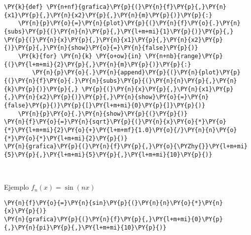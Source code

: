     \begin{tcolorbox}[breakable, size=fbox, boxrule=1pt, pad at break*=1mm,colback=cellbackground, colframe=cellborder]
\begin{Verbatim}[commandchars=\\\{\}]
\PY{k}{def} \PY{n+nf}{grafica}\PY{p}{(}\PY{n}{f}\PY{p}{,}\PY{n}{x1}\PY{p}{,}\PY{n}{x2}\PY{p}{,}\PY{n}{m}\PY{p}{)}\PY{p}{:}
    \PY{n}{p}\PY{o}{=}\PY{n}{plot}\PY{p}{(}\PY{n}{f}\PY{o}{.}\PY{n}{subs}\PY{p}{(}\PY{n}{n}\PY{p}{,}\PY{l+m+mi}{1}\PY{p}{)}\PY{p}{,} \PY{p}{(}\PY{n}{x}\PY{p}{,}\PY{n}{x1}\PY{p}{,}\PY{n}{x2}\PY{p}{)}\PY{p}{,}\PY{n}{show}\PY{o}{=}\PY{n}{false}\PY{p}{)}
    \PY{k}{for} \PY{n}{k} \PY{o+ow}{in} \PY{n+nb}{range}\PY{p}{(}\PY{l+m+mi}{2}\PY{p}{,}\PY{n}{m}\PY{p}{)}\PY{p}{:}
        \PY{n}{p}\PY{o}{.}\PY{n}{append}\PY{p}{(}\PY{n}{plot}\PY{p}{(}\PY{n}{f}\PY{o}{.}\PY{n}{subs}\PY{p}{(}\PY{n}{n}\PY{p}{,}\PY{n}{k}\PY{p}{)}\PY{p}{,} \PY{p}{(}\PY{n}{x}\PY{p}{,}\PY{n}{x1}\PY{p}{,}\PY{n}{x2}\PY{p}{)}\PY{p}{,}\PY{n}{show}\PY{o}{=}\PY{n}{false}\PY{p}{)}\PY{p}{[}\PY{l+m+mi}{0}\PY{p}{]}\PY{p}{)}
    \PY{n}{p}\PY{o}{.}\PY{n}{show}\PY{p}{(}\PY{p}{)}
\PY{n}{f}\PY{o}{=}\PY{n}{sqrt}\PY{p}{(}\PY{n}{x}\PY{o}{*}\PY{o}{*}\PY{l+m+mi}{2}\PY{o}{+}\PY{l+m+mf}{1.0}\PY{o}{/}\PY{n}{n}\PY{o}{*}\PY{o}{*}\PY{l+m+mi}{2}\PY{p}{)}
\PY{n}{grafica}\PY{p}{(}\PY{n}{f}\PY{p}{,}\PY{o}{\PYZhy{}}\PY{l+m+mi}{5}\PY{p}{,}\PY{l+m+mi}{5}\PY{p}{,}\PY{l+m+mi}{10}\PY{p}{)}
\end{Verbatim}
\end{tcolorbox}

    \begin{center}
    \end{center}
    { \hspace*{\fill} \\}
    
    Ejemplo \(f_n(x)=\sin(nx)\)

    \begin{tcolorbox}[breakable, size=fbox, boxrule=1pt, pad at break*=1mm,colback=cellbackground, colframe=cellborder]
\begin{Verbatim}[commandchars=\\\{\}]
\PY{n}{f}\PY{o}{=}\PY{n}{sin}\PY{p}{(}\PY{n}{n}\PY{o}{*}\PY{n}{x}\PY{p}{)}
\PY{n}{grafica}\PY{p}{(}\PY{n}{f}\PY{p}{,}\PY{l+m+mi}{0}\PY{p}{,}\PY{n}{pi}\PY{p}{,}\PY{l+m+mi}{10}\PY{p}{)}
\end{Verbatim}
\end{tcolorbox}

